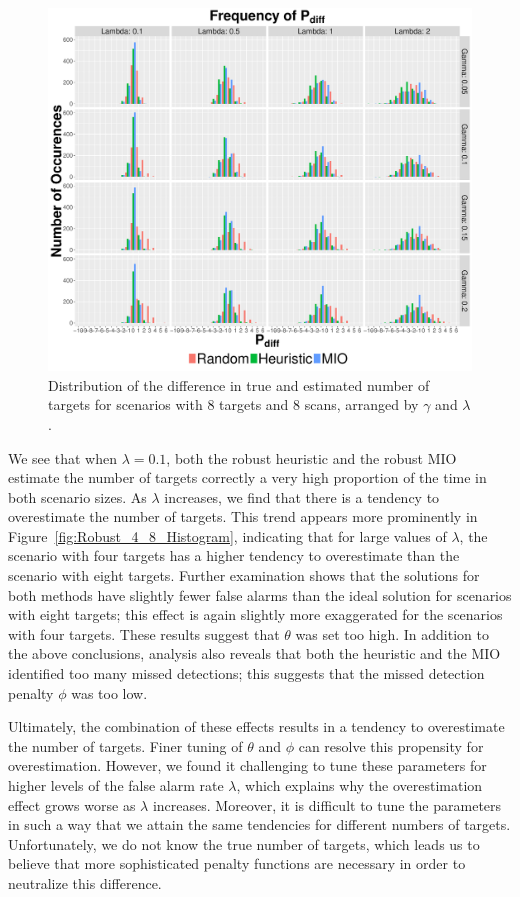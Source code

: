 \begin{figure}[ht]
  \centering
  \includegraphics[width=\columnwidth]{../Figures/8_8_Histogram}
  \caption{Distribution of the difference in true and estimated number of targets for scenarios with 8 targets and 8 scans, arranged by $\gamma$ and $\lambda$.}
  \label{fig:Robust_8_8_Histogram}
\end{figure}

We see that when $\lambda = 0.1$, both the robust heuristic and the robust MIO estimate the number of targets correctly a very high proportion of the time in both scenario sizes. As $\lambda$ increases, we find that there is a tendency to overestimate the number of targets. This trend appears more prominently in Figure~\ref{fig:Robust_4_8_Histogram}, indicating that for large values of $\lambda$, the scenario with four targets has a higher tendency to overestimate than the scenario with eight targets. Further examination shows that the solutions for both methods have slightly fewer false alarms than the ideal solution for scenarios with eight targets; this effect is again slightly more exaggerated for the scenarios with four targets. These results suggest that $\theta$ was set too high. In addition to the above conclusions, analysis also reveals that both the heuristic and the MIO identified too many missed detections; this suggests that the missed detection penalty $\phi$ was too low. 

Ultimately, the combination of these effects results in a tendency to overestimate the number of targets. Finer tuning of $\theta$ and $\phi$ can resolve this propensity for overestimation. However, we found it challenging to tune these parameters for higher levels of the false alarm rate $\lambda$, which explains why the overestimation effect grows worse as $\lambda$ increases. Moreover, it is difficult to tune the parameters in such a way that we attain the same tendencies for different numbers of targets. Unfortunately, we do not know the true number of targets, which leads us to believe that more sophisticated penalty functions are necessary in order to neutralize this difference.

